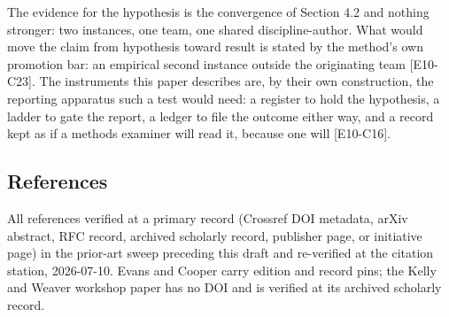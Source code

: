 \documentclass[
  11pt,
]{article}
\begin{document}
The evidence for the hypothesis is the convergence of Section 4.2 and
nothing stronger: two instances, one team, one shared discipline-author.
What would move the claim from hypothesis toward result is stated by the
method's own promotion bar: an empirical second instance outside the
originating team {[}E10-C23{]}. The instruments this paper describes
are, by their own construction, the reporting apparatus such a test
would need: a register to hold the hypothesis, a ladder to gate the
report, a ledger to file the outcome either way, and a record kept as if
a methods examiner will read it, because one will {[}E10-C16{]}.

\subsection{References}\label{references}

All references verified at a primary record (Crossref DOI metadata,
arXiv abstract, RFC record, archived scholarly record, publisher page,
or initiative page) in the prior-art sweep preceding this draft and
re-verified at the citation station, 2026-07-10. Evans and Cooper carry
edition and record pins; the Kelly and Weaver workshop paper has no DOI
and is verified at its archived scholarly record.
\end{document}
